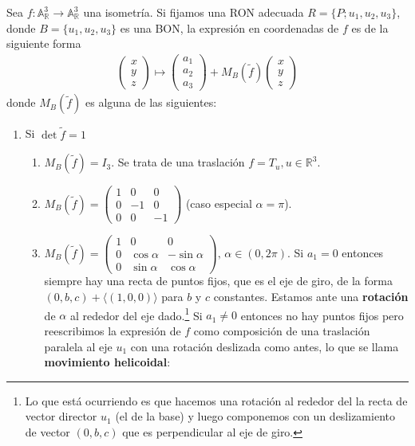 \documentclass[14pt]{book}
\begin{document}
\begin{tm}
	Sea $f:\mathbb{A}_\mathbb{R}^3 \to \mathbb{A}_\mathbb{R}^3$ una isometría. Si fijamos una RON adecuada $R = \{P; u_1, u_2, u_3\}$, donde $B = \{u_1, u_2, u_3\}$ es una BON, la expresión en coordenadas de $f$ es de la siguiente forma
	\begin{align*}
	\left(\begin{array}{c}
	x \\ y \\ z
	\end{array}\right) \mapsto
	\left(\begin{array}{c}
	a_1 \\ a_2 \\ a_3
	\end{array}\right) + 
	M_B(\tilde{f})\left(\begin{array}{c}
	x \\ y \\ z
	\end{array}\right)
	\end{align*}
	donde $M_B(\tilde{f})$ es  alguna de las siguientes:
	\begin{enumerate}
		\item Si $\det \tilde{f} = 1$
		\begin{enumerate}
			\item $M_B(\tilde{f}) = I_3$. Se trata de una traslación $f = T_u, u \in \mathbb{R}^3$.
			\item $M_B(\tilde{f}) = \left(\begin{array}{ccc}
			1 & 0 & 0 \\
			0 & -1 & 0 \\
			0 & 0 & -1
			\end{array}\right)$ (caso especial $\alpha = \pi$).
			\item $M_B(\tilde{f}) = \left(\begin{array}{ccc}
			1 & 0 & 0 \\
			0 & \cos \alpha & - \sin \alpha \\
			0 & \sin \alpha & \cos \alpha
			\end{array}\right),\, \alpha \in (0, 2\pi)$. Si $a_1 = 0$ entonces siempre hay una recta de puntos fijos, que es el eje de giro, de la forma $(0, b, c) + \langle (1, 0, 0) \rangle$ para $b$ y $c$ constantes. Estamos ante una \textbf{rotación} de $\alpha$ al rededor del eje dado.\footnote{Lo que está ocurriendo es que hacemos una rotación al rededor del la recta de vector director $u_1$ (el de la base) y luego componemos con un deslizamiento de vector $(0, b, c)$ que es perpendicular al eje de giro.} Si $a_1 ≠ 0$ entonces no hay puntos fijos pero reescribimos la expresión de $f$ como composición de una traslación paralela al eje $u_1$ con una rotación deslizada como antes, lo que se llama \textbf{movimiento helicoidal}:

\end{enumerate}
\end{enumerate}
\end{tm}
\end{document}
